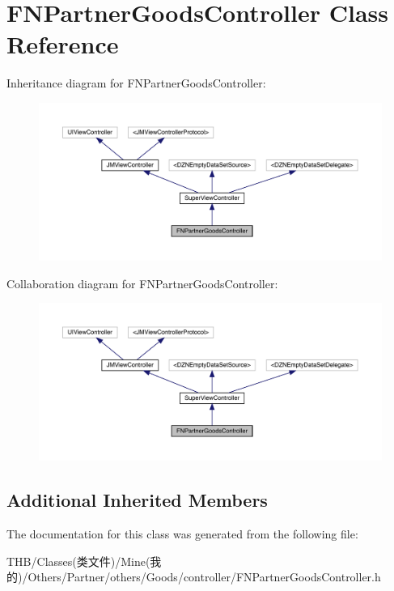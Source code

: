 \hypertarget{interface_f_n_partner_goods_controller}{}\section{F\+N\+Partner\+Goods\+Controller Class Reference}
\label{interface_f_n_partner_goods_controller}


Inheritance diagram for F\+N\+Partner\+Goods\+Controller\+:\nopagebreak
\begin{figure}[H]
\begin{center}
\leavevmode
\includegraphics[width=350pt]{interface_f_n_partner_goods_controller__inherit__graph}
\end{center}
\end{figure}


Collaboration diagram for F\+N\+Partner\+Goods\+Controller\+:\nopagebreak
\begin{figure}[H]
\begin{center}
\leavevmode
\includegraphics[width=350pt]{interface_f_n_partner_goods_controller__coll__graph}
\end{center}
\end{figure}
\subsection*{Additional Inherited Members}


The documentation for this class was generated from the following file\+:\begin{DoxyCompactItemize}
\item 
T\+H\+B/\+Classes(类文件)/\+Mine(我的)/\+Others/\+Partner/others/\+Goods/controller/F\+N\+Partner\+Goods\+Controller.\+h\end{DoxyCompactItemize}

